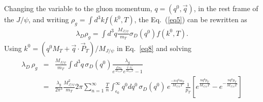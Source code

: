 \documentclass[aps,prc,preprint,superscriptaddress,showpacs,showkeys]{revtex4-1}
\begin{document}
  Changing the variable to the gluon momentum, $q=(q^0,\vec{q})$, in
the rest frame of the $J/\psi$, and writing $\rho_g = \int d^3k f(k^0,T)$, 
the Eq.~(\ref{eq5}) can be rewritten as
\begin{eqnarray}
\lambda_D \rho_g  =  \int d^3q \frac{M_{J/\psi}}{m_T}\sigma_{D}(q^0) f(k^0,T).
\label{eq8}
\end{eqnarray}
  Using $ k^0=(q^0M_T+\vec{q}\cdot\vec{P}_T)/M_{J/\psi}$ in Eq.~\ref{eq8} and solving
\begin{eqnarray} 
\lambda_D\,\rho_g &= &\frac{M_{J/\psi}}{m_T} \int d^3q \, \sigma_{D}(q^0) \frac{\lambda_{g}} {  e^{ \frac{q^0m_{T}}{M_{J/\psi}T}} e^{ \frac{ \vec{q}\cdot \vec{p_{T} } }{ M_{J/\psi}T }  } -1}  \nonumber \\
&= &\frac{\lambda_{g}}{2\pi^3} \frac{M_{J/\psi}^2}{m_T} 2\pi \sum_{n=1}^{\infty} \frac{T}{n} \int_{\epsilon_0}^{\infty} q^0 dq^0 \, \sigma_{D}(q^0)  
     \,e^{ \frac{-n\,q^0 m_{T}}{M_{J/\psi}T}} 
     \frac{1}{p_T} \left[e^{\frac{n q^0 p_T}{M_{J/\psi}T}} - e^{- \frac{n q^0 p_T}{M_{J/\psi}T}}\right] \\ \nonumber
\label{dissrate}
\end{eqnarray}


\end{document}
